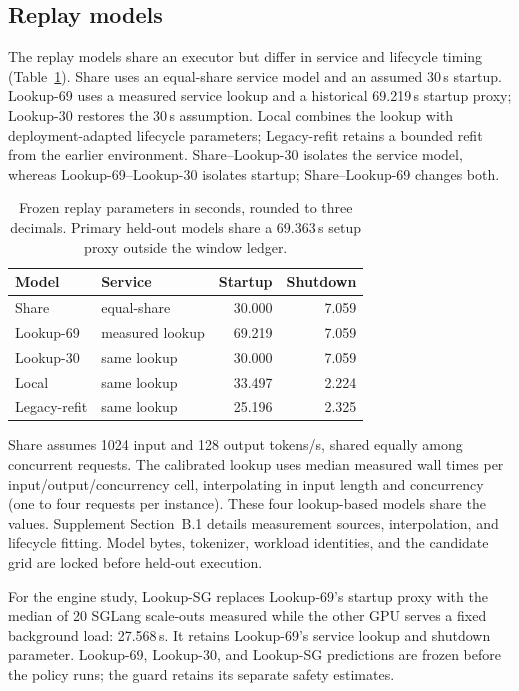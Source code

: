 \subsection{Replay models}
The replay models share an executor but differ in service and lifecycle timing
(Table~\ref{tab:replay-model-parameters}). Share uses an equal-share service model
and an assumed 30\,s startup. Lookup-69 uses a measured service lookup and a historical
69.219\,s startup proxy; Lookup-30 restores the 30\,s assumption. Local combines the
lookup with deployment-adapted lifecycle parameters; Legacy-refit retains a bounded
refit from the earlier environment. Share--Lookup-30 isolates the service model,
whereas Lookup-69--Lookup-30 isolates startup; Share--Lookup-69 changes both.

\begin{table}[t]
\centering
\small
\caption{Frozen replay parameters in seconds, rounded to three decimals.
Primary held-out models share a 69.363\,s setup proxy outside the window ledger.}
\label{tab:replay-model-parameters}
\setlength{\tabcolsep}{3pt}
\par\vspace{4pt}
\begin{tabular*}{\linewidth}{@{\extracolsep{\fill}}llrr@{}}
\toprule
Model & Service & Startup & Shutdown\\
\midrule
Share & equal-share & 30.000 & 7.059\\
Lookup-69 & measured lookup & 69.219 & 7.059\\
Lookup-30 & same lookup & 30.000 & 7.059\\
Local & same lookup & 33.497 & 2.224\\
Legacy-refit & same lookup & 25.196 & 2.325\\
\bottomrule
\end{tabular*}
\end{table}

Share assumes 1024 input and 128 output tokens/s, shared equally among concurrent
requests. The calibrated lookup uses median measured wall times per
input/output/concurrency cell, interpolating in input length and concurrency
(one to four requests per instance). These four lookup-based models share the values.
Supplement Section~B.1 details measurement sources, interpolation, and lifecycle fitting. Model bytes, tokenizer, workload identities,
and the candidate grid are locked before held-out execution.

For the engine study, Lookup-SG replaces Lookup-69's startup proxy with the median of 20
SGLang scale-outs measured while the other GPU serves a fixed background
load: 27.568\,s. It retains Lookup-69's service lookup and shutdown parameter.
Lookup-69, Lookup-30, and Lookup-SG predictions are frozen before the policy runs;
the guard retains its separate safety estimates.

